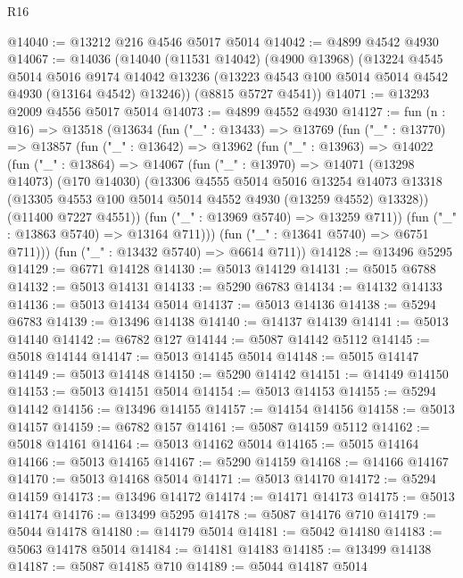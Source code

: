 \begin{lexlean}{R16}
\begin{coremodule}
@14040 := @13212 @216 @4546 @5017 @5014
@14042 := @4899 @4542 @4930
@14067 := @14036
    (@14040
      (@11531 @14042)
      (@4900 @13968)
      (@13224
        @4545
        @5014
        @5016
        @9174
        @14042
        @13236
        (@13223 @4543 @100 @5014 @5014 @4542 @4930 (@13164 @4542) @13246))
      (@8815 @5727 @4541))
@14071 := @13293 @2009 @4556 @5017 @5014
@14073 := @4899 @4552 @4930
@14127 := fun (n : @16) =>
  @13518
    (@13634
      (fun ("_" : @13433) =>
      @13769
        (fun ("_" : @13770) =>
        @13857
          (fun ("_" : @13642) =>
          @13962
            (fun ("_" : @13963) =>
            @14022
              (fun ("_" : @13864) =>
              @14067
                (fun ("_" : @13970) =>
                @14071
                  (@13298 @14073)
                  (@170 @14030)
                  (@13306
                    @4555
                    @5014
                    @5016
                    @13254
                    @14073
                    @13318
                    (@13305 @4553 @100 @5014 @5014 @4552 @4930 (@13259 @4552) @13328))
                  (@11400 @7227 @4551))
                (fun ("_" : @13969 @5740) => @13259 @711))
              (fun ("_" : @13863 @5740) => @13164 @711)))
          (fun ("_" : @13641 @5740) => @6751 @711)))
      (fun ("_" : @13432 @5740) => @6614 @711))
@14128 := @13496 @5295
@14129 := @6771 @14128
@14130 := @5013 @14129
@14131 := @5015 @6788
@14132 := @5013 @14131
@14133 := @5290 @6783
@14134 := @14132 @14133
@14136 := @5013 @14134 @5014
@14137 := @5013 @14136
@14138 := @5294 @6783
@14139 := @13496 @14138
@14140 := @14137 @14139
@14141 := @5013 @14140
@14142 := @6782 @127
@14144 := @5087 @14142 @5112
@14145 := @5018 @14144
@14147 := @5013 @14145 @5014
@14148 := @5015 @14147
@14149 := @5013 @14148
@14150 := @5290 @14142
@14151 := @14149 @14150
@14153 := @5013 @14151 @5014
@14154 := @5013 @14153
@14155 := @5294 @14142
@14156 := @13496 @14155
@14157 := @14154 @14156
@14158 := @5013 @14157
@14159 := @6782 @157
@14161 := @5087 @14159 @5112
@14162 := @5018 @14161
@14164 := @5013 @14162 @5014
@14165 := @5015 @14164
@14166 := @5013 @14165
@14167 := @5290 @14159
@14168 := @14166 @14167
@14170 := @5013 @14168 @5014
@14171 := @5013 @14170
@14172 := @5294 @14159
@14173 := @13496 @14172
@14174 := @14171 @14173
@14175 := @5013 @14174
@14176 := @13499 @5295
@14178 := @5087 @14176 @710
@14179 := @5044 @14178
@14180 := @14179 @5014
@14181 := @5042 @14180
@14183 := @5063 @14178 @5014
@14184 := @14181 @14183
@14185 := @13499 @14138
@14187 := @5087 @14185 @710
@14189 := @5044 @14187 @5014

\end{coremodule}
\end{lexlean}
